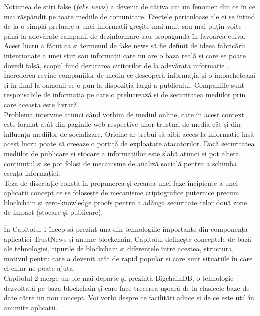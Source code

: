 \hfill

Noțiunea de știri false (\textit{fake news}) a devenit de câțiva ani un fenomen din ce în ce mai răspândit pe toate mediile de comunicare. Efectele periculoase ale ei se întind de la o simplă preluare a unei informații greșite mai mult sau mai puțin voite până la adevărate campanii de dezinformare sau propagandă în favoarea cuiva.\\

Acest lucru a făcut ca și termenul de fake news să fie definit de ideea fabricării intenționate a unei știri sau informații care nu are o baza reală și care se poate dovedi falsă, scopul fiind derutarea cititorilor de la adevărata informație \cite{FakeNews_Def}.\\

Încrederea revine companiilor de media ce descoperă informația și o împachetează și în final la oamenii ce o pun la dispoziția largă a publicului. Companiile sunt responsabile de informația pe care o prelucrează și de securitatea mediilor prin care aceasta este livrată.\\

Problema intervine atunci când vorbim de mediul online, care în acest context este format atât din paginile web respective unor trusturi de media cât și din influența mediilor de socializare. Oricine ar trebui să aibă acces la informație însă acest lucru poate să creeaze o portiță de exploatare atacatorilor. Dacă securitatea mediilor de publicare și stocare a informațiilor este slabă atunci ei pot altera conținutul și se pot folosi de mecanisme de analiză socială pentru a schimba esența informației.\\

Teza de disertație constă în propunerea și crearea unei faze incipiente a unei aplicații concept ce se folosește de mecanisme criptografice puternice precum blockchain și zero-knowledge proofs pentru a adăuga securitate celor două zone de impact (stocare și publicare).\\

\clearpage

În Capitolul 1 încep să prezint una din tehnologiile importante din componența aplicației TrustNews și anume blockchain. Capitolul definește conceptele de bază ale tehnologiei, tipurile de blockchain și diferențele între acestea, structura,  motivul pentru care a devenit atât de rapid popular și care sunt situațiile în care el chiar ne poate ajuta.\\

Capitolul 2 merge un pic mai departe și prezintă BigchainDB, o tehnologie dezvoltată pe baza blockchain și care face trecerea ușoară de la clasicele baze de date către un nou concept. Voi vorbi despre ce facilități aduce și de ce este util în anumite aplicații.\\

